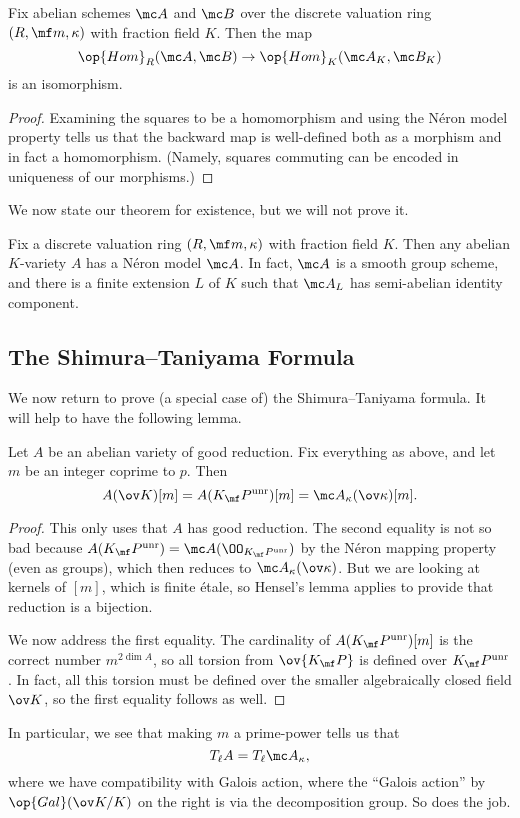 \documentclass[../notes.tex]{subfiles}
\begin{document}
\begin{corollary}
	Fix abelian schemes $\mc A$ and $\mc B$ over the discrete valuation ring $(R,\mf m,\kappa)$ with fraction field $K$. Then the map
	\[\op{Hom}_R(\mc A,\mc B)\to\op{Hom}_K(\mc A_K,\mc B_K)\]
	is an isomorphism.
\end{corollary}
\begin{proof}
	Examining the squares to be a homomorphism and using the N\'eron model property tells us that the backward map is well-defined both as a morphism and in fact a homomorphism. (Namely, squares commuting can be encoded in uniqueness of our morphisms.)
\end{proof}
We now state our theorem for existence, but we will not prove it.
\begin{theorem}
	Fix a discrete valuation ring $(R,\mf m,\kappa)$ with fraction field $K$. Then any abelian $K$-variety $A$ has a N\'eron model $\mc A$. In fact, $\mc A$ is a smooth group scheme, and there is a finite extension $L$ of $K$ such that $\mc A_L$ has semi-abelian identity component.
\end{theorem}

\subsection{The Shimura--Taniyama Formula}
We now return to prove (a special case of) the Shimura--Taniyama formula. It will help to have the following lemma.
\begin{lemma} \label{lem:torsion-everywhere-agrees}
	Let $A$ be an abelian variety of good reduction. Fix everything as above, and let $m$ be an integer coprime to $p$. Then
	\[A(\ov K)[m]=A(K_\mf P^{\mathrm{unr}})[m]=\mc A_\kappa(\ov\kappa)[m].\]
\end{lemma}
\begin{proof}
	This only uses that $A$ has good reduction. The second equality is not so bad because $A(K_\mf P^{\mathrm{unr}})=\mc A(\OO_{K_\mf P^{\mathrm{unr}}})$ by the N\'eron mapping property (even as groups), which then reduces to $\mc A_\kappa(\ov\kappa)$. But we are looking at kernels of $[m]$, which is finite \'etale, so Hensel's lemma applies to provide that reduction is a bijection.
	
	We now address the first equality. The cardinality of $A(K_\mf P^{\mathrm{unr}})[m]$ is the correct number $m^{2\dim A}$, so all torsion from $\ov{K_\mf P}$ is defined over $K_\mf P^{\mathrm{unr}}$. In fact, all this torsion must be defined over the smaller algebraically closed field $\ov K$, so the first equality follows as well.
\end{proof}
In particular, we see that making $m$ a prime-power tells us that
\[T_\ell A=T_\ell\mc A_\kappa,\]
where we have compatibility with Galois action, where the ``Galois action'' by $\op{Gal}(\ov K/K)$ on the right is via the decomposition group. So  does the job.
\end{document}
